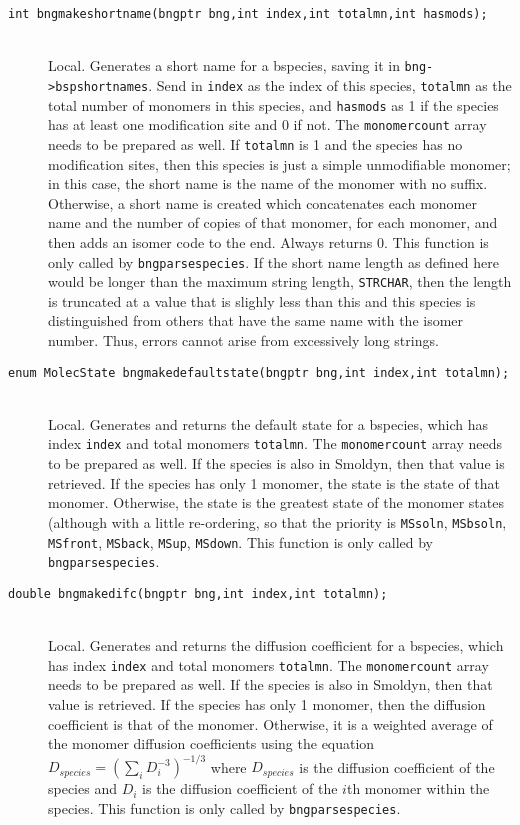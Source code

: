 \documentclass {book}
\begin{document}
\begin{description}
\item[\texttt{int bngmakeshortname(bngptr bng,int index,int totalmn,int hasmods);}]
\hfill \\
Local.  Generates a short name for a bspecies, saving it in \texttt{bng->bspshortnames}.  Send in \texttt{index} as the index of this species, \texttt{totalmn} as the total number of monomers in this species, and \texttt{hasmods} as 1 if the species has at least one modification site and 0 if not.  The \texttt{monomercount} array needs to be prepared as well.  If \texttt{totalmn} is 1 and the species has no modification sites, then this species is just a simple unmodifiable monomer; in this case, the short name is the name of the monomer with no suffix.  Otherwise, a short name is created which concatenates each monomer name and the number of copies of that monomer, for each monomer, and then adds an isomer code to the end.  Always returns 0.  This function is only called by \texttt{bngparsespecies}.  If the short name length as defined here would be longer than the maximum string length, \texttt{STRCHAR}, then the length is truncated at a value that is slighly less than this and this species is distinguished from others that have the same name with the isomer number.  Thus, errors cannot arise from excessively long strings.

\item[\texttt{enum MolecState bngmakedefaultstate(bngptr bng,int index,int totalmn);}]
\hfill \\
Local.  Generates and returns the default state for a bspecies, which has index \texttt{index} and total monomers \texttt{totalmn}.  The \texttt{monomercount} array needs to be prepared as well.  If the species is also in Smoldyn, then that value is retrieved.  If the species has only 1 monomer, the state is the state of that monomer.  Otherwise, the state is the greatest state of the monomer states (although with a little re-ordering, so that the priority is \texttt{MSsoln}, \texttt{MSbsoln}, \texttt{MSfront}, \texttt{MSback}, \texttt{MSup}, \texttt{MSdown}.  This function is only called by \texttt{bngparsespecies}.

\item[\texttt{double bngmakedifc(bngptr bng,int index,int totalmn);}]
\hfill \\
Local.  Generates and returns the diffusion coefficient for a bspecies, which has index \texttt{index} and total monomers \texttt{totalmn}.  The \texttt{monomercount} array needs to be prepared as well.  If the species is also in Smoldyn, then that value is retrieved.  If the species has only 1 monomer, then the diffusion coefficient is that of the monomer.  Otherwise, it is a weighted average of the monomer diffusion coefficients using the equation
$D_{species} = (\sum_{i} D_i^{-3})^{-1/3}$
where $D_{species}$ is the diffusion coefficient of the species and $D_i$ is the diffusion coefficient of the $i$th monomer within the species.  This function is only called by \texttt{bngparsespecies}.


\end{description}
\end{document}
